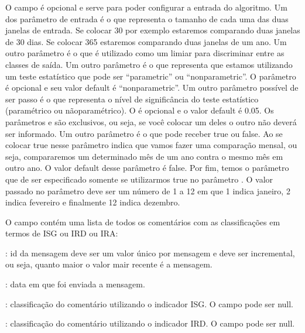 \documentclass[letterpaper,10pt,english]{sphinxmanual}
\begin{document}
\sphinxAtStartPar
O campo  é opcional e serve para poder configurar a entrada do algoritmo.
Um dos parâmetro de entrada é o  que representa o tamanho de cada
uma das duas janelas de entrada. Se colocar 30 por exemplo estaremos comparando duas
janelas de 30 dias. Se colocar 365 estaremos comparando duas janelas de um ano.
Um outro parâmetro é o  que é utilizado como um limiar para discriminar entre
as classes de saída. Um outro parâmetro é o  que representa que estamos
utilizando um teste estatístico que pode ser “parametric” ou “nonparametric”. O parâmetro
 é opcional e seu valor default é “nonparametric”. Um outro
parâmetro possível de ser passo é o  que representa o nível de significância do
teste estatístico (paramétrico ou não\sphinxhyphen{}paramétrico). O  é opcional e o valor
default é 0.05. Os parâmetros  e  são exclusivos, ou seja, se você
colocar um deles o outro não deverá ser informado. Um outro parâmetro é o
 que pode receber true ou false. Ao se colocar true nesse
parâmetro indica que vamos fazer uma comparação mensal, ou seja, compararemos um
determinado mês de um ano contra o mesmo mês em outro ano. O valor default desse
parâmetro é false. Por fim, temos o parâmetro  que de ser especificado
somente se utilizarmos true no parâmetro . O valor passado no
parâmetro  deve ser um número de 1 a 12 em que 1 indica janeiro,
2 indica fevereiro e finalmente 12 indica dezembro.

\sphinxAtStartPar
O campo  contém uma lista de todos os comentários com as classificações em termos de ISG ou IRD ou IRA:

\sphinxAtStartPar
{}: id da mensagem deve ser um valor único por mensagem e deve ser incremental, ou seja, quanto maior o valor mair recente é a mensagem.

\sphinxAtStartPar
{}: data em que foi enviada a mensagem.

\sphinxAtStartPar
{}: classificação do comentário utilizando o indicador ISG. O campo pode ser null.

\sphinxAtStartPar
{}: classificação do comentário utilizando o indicador IRD. O campo pode ser null.
\end{document}
